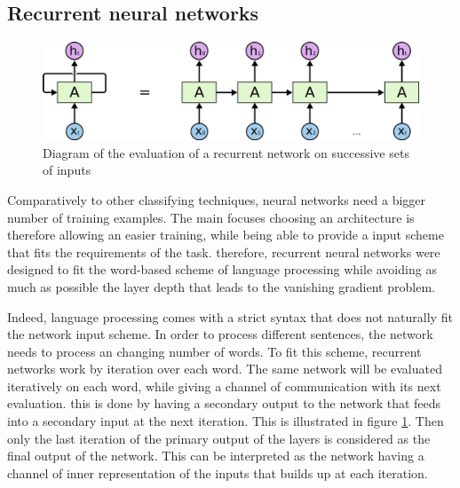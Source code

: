 

\subsection{Recurrent neural networks}

\begin{figure}
    \centering
    \includegraphics[width=\textwidth]{Images/recurrent_network.png}
    \caption{Diagram of the evaluation of a recurrent network on successive sets of inputs}
    \label{fig:recurrent_network}
\end{figure}

Comparatively to other classifying techniques, neural networks need a bigger number of training examples. The main focuses choosing an architecture is therefore allowing an easier training, while being able to provide a input scheme that fits the requirements of the task. therefore, recurrent neural networks were designed to fit the word-based scheme of language processing while avoiding as much as possible the layer depth that leads to the vanishing gradient problem.

Indeed, language processing comes with a strict syntax that does not naturally fit the network input scheme. In order to process different sentences, the network needs to process an changing number of words. To fit this scheme, recurrent networks work by iteration over each word. The same network will be evaluated iteratively on each word, while giving a channel of communication with its next evaluation. this is done by having a secondary output to the network that feeds into a secondary input at the next iteration. This is illustrated in figure \ref{fig:recurrent_network}. Then only the last iteration of the primary output of the layers is considered as the final output of the network. This can be interpreted as the network having a channel of inner representation of the inputs that builds up at each iteration.

